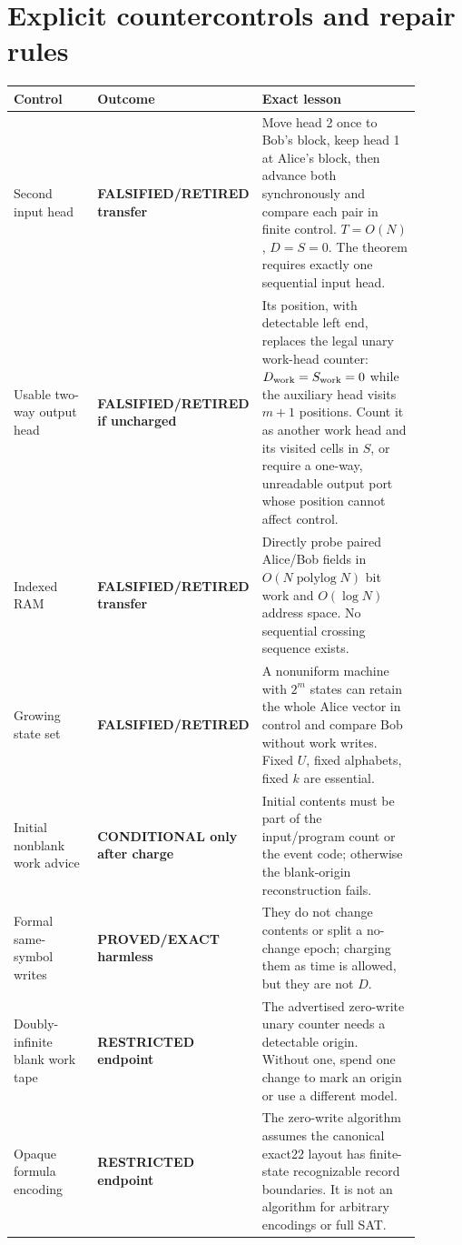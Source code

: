 \documentclass[11pt]{article}
\begin{document}
\section{Explicit countercontrols and repair rules}
\begin{longtable}{p{0.22\linewidth}p{0.25\linewidth}p{0.42\linewidth}}
\toprule
Control & Outcome & Exact lesson \\
\midrule
Second input head & \textbf{FALSIFIED/RETIRED transfer} & Move head 2 once to
Bob's block, keep head 1 at Alice's block, then advance both synchronously and
compare each pair in finite control.  $T=O(N)$, $D=S=0$.  The theorem requires
exactly one sequential input head.\\
Usable two-way output head & \textbf{FALSIFIED/RETIRED if uncharged} & Its
position, with detectable left end, replaces the legal unary work-head
counter: $D_{\rm work}=S_{\rm work}=0$ while the auxiliary head visits $m+1$
positions.  Count it as another work head and its visited cells in $S$, or
require a one-way, unreadable output port whose position cannot affect control.\\
Indexed RAM & \textbf{FALSIFIED/RETIRED transfer} & Directly probe paired
Alice/Bob fields in $O(N\operatorname{polylog}N)$ bit work and $O(\log N)$
address space.  No sequential crossing sequence exists.\\
Growing state set & \textbf{FALSIFIED/RETIRED} & A nonuniform machine with
$2^m$ states can retain the whole Alice vector in control and compare Bob
without work writes.  Fixed $U$, fixed alphabets, fixed $k$ are essential.\\
Initial nonblank work advice & \textbf{CONDITIONAL only after charge} & Initial
contents must be part of the input/program count or the event code; otherwise
the blank-origin reconstruction fails.\\
Formal same-symbol writes & \textbf{PROVED/EXACT harmless} & They do not change
contents or split a no-change epoch; charging them as time is allowed, but they
are not $D$.\\
Doubly-infinite blank work tape & \textbf{RESTRICTED endpoint} & The advertised
zero-write unary counter needs a detectable origin.  Without one, spend one
change to mark an origin or use a different model.\\
Opaque formula encoding & \textbf{RESTRICTED endpoint} & The zero-write
algorithm assumes the canonical exact22 layout has finite-state recognizable
record boundaries.  It is not an algorithm for arbitrary encodings or full
SAT.\\
\bottomrule
\end{longtable}
\end{document}
